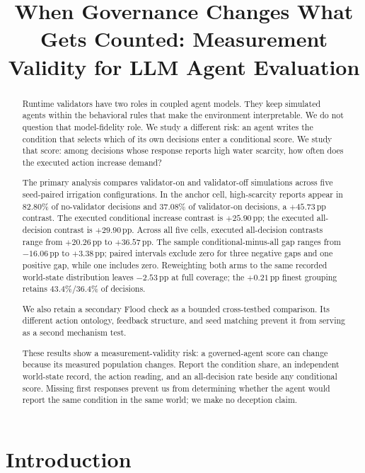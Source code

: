 \documentclass{article}
\title{When Governance Changes What Gets Counted: Measurement Validity for LLM Agent Evaluation}
\author{}
\newcommand{\pp}{\,\mathrm{pp}}
\begin{document}
\maketitle

\begin{abstract}
Runtime validators have two roles in coupled agent models. They keep simulated agents within the behavioral rules that make the environment interpretable. We do not question that model-fidelity role. We study a different risk: an agent writes the condition that selects which of its own decisions enter a conditional score. We study that score: among decisions whose response reports high water scarcity, how often does the executed action increase demand?

The primary analysis compares validator-on and validator-off simulations across five seed-paired irrigation configurations. In the anchor cell, high-scarcity reports appear in 82.80\% of no-validator decisions and 37.08\% of validator-on decisions, a $+45.73\pp$ contrast. The executed conditional increase contrast is $+25.90\pp$; the executed all-decision contrast is $+29.90\pp$. Across all five cells, executed all-decision contrasts range from $+20.26\pp$ to $+36.57\pp$. The sample conditional-minus-all gap ranges from $-16.06\pp$ to $+3.38\pp$; paired intervals exclude zero for three negative gaps and one positive gap, while one includes zero. Reweighting both arms to the same recorded world-state distribution leaves $-2.53\pp$ at full coverage; the $+0.21\pp$ finest grouping retains 43.4\%/36.4\% of decisions.

We also retain a secondary Flood check as a bounded cross-testbed comparison. Its different action ontology, feedback structure, and seed matching prevent it from serving as a second mechanism test.

These results show a measurement-validity risk: a governed-agent score can change because its measured population changes. Report the condition share, an independent world-state record, the action reading, and an all-decision rate beside any conditional score. Missing first responses prevent us from determining whether the agent would report the same condition in the same world; we make no deception claim.
\end{abstract}

\section{Introduction}
\end{document}
